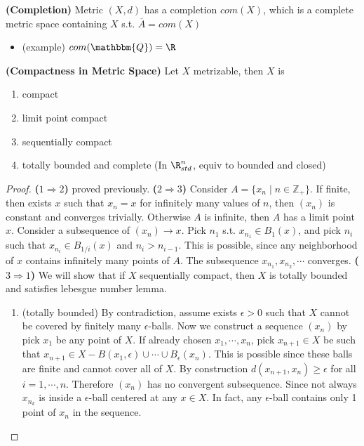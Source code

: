 \documentclass[10.5pt]{article}
\newcommand{\Z}{\mathbb{Z}}
\newcommand{\Q}{\mathbbm{Q}}
\begin{document}
\begin{defn*}
    \textbf{(Completion)} Metric $(X,d)$ has a completion $com(X)$, which is a complete metric space containing $X$ s.t. $\overline{A} = com(X)$
    \begin{itemize}
        \item (example) $com(\Q) = \R$
    \end{itemize}
\end{defn*}




\begin{theorem*}
    \textbf{(Compactness in Metric Space)} Let $X$ metrizable, then $X$ is 
    \begin{enumerate}
        \item compact
        \item limit point compact
        \item sequentially compact
        \item totally bounded and complete (In $\R^n_{std}$, equiv to bounded and closed)
    \end{enumerate}
    \begin{proof}
        \textbf{($1\Rightarrow 2$)} proved previously. \textbf{($2\Rightarrow 3$)} Consider $A = \{x_n \mid n\in \Z_+\}$. If finite, then exists $x$ such that $x_n= x$ for infinitely many values of $n$, then $(x_n)$ is constant and converges trivially. Otherwise $A$ is infinite, then $A$ has a limit point $x$. Consider a subsequence of $(x_n)\to x$. Pick $n_1$ s.t. $x_{n_1} \in B_1(x)$, and pick $n_i$ such that $x_{n_i} \in B_{1/i}(x)$ and $n_i > n_{i-1}$. This is possible, since any neighborhood of $x$ contains infinitely many points of $A$. The subsequence $x_{n_1}, x_{n_2},\cdots$ converges. \textbf{($3\Rightarrow 1$)} We will show that if $X$ sequentially compact, then $X$ is totally bounded and satisfies lebesgue number lemma.
        \begin{enumerate}
            \item (totally bounded) By contradiction, assume exists $\epsilon>0$ such that $X$ cannot be covered by finitely many $\epsilon$-balls. Now we construct a sequence $(x_n)$ by pick $x_1$ be any point of $X$. If already chosen $x_1,\cdots,x_n$, pick $x_{n+1} \in X$ be such that $x_{n+1}\in X - B(x_1,\epsilon) \cup \cdots \cup B_{\epsilon}(x_n)$. This is possible since these balls are finite and cannot cover all of $X$. By construction $d(x_{n+1}, x_n) \geq \epsilon$ for all $i=1,\cdots,n$. Therefore $(x_n)$ has no convergent subsequence. Since not always $x_{n_k}$ is inside a $\epsilon$-ball centered at any $x\in X$. In fact, any $\epsilon$-ball contains only 1 point of $x_{n}$ in the sequence.

\end{enumerate}
\end{proof}
\end{theorem*}
\end{document}
